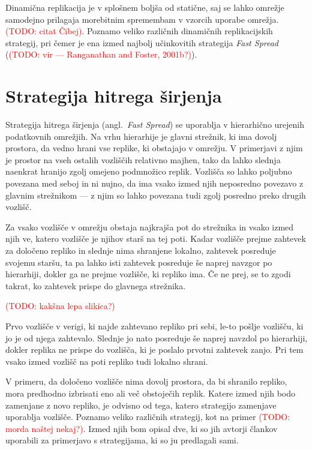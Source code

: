 \documentclass[a4paper, 12pt]{book}
\newcommand{\newterm}{\textit}
\newcommand{\TODO}[1]{\textcolor{red}{(TODO: #1)}}
\begin{document}
Dinamična replikacija je v splošnem boljša od statične, saj se lahko
omre\-žje samodejno prilagaja morebitnim spremembam v vzorcih uporabe omrežja.
\TODO{citat Čibej}. Poznamo veliko različnih dinamičnih replikacijskih
strategij, pri čemer je ena izmed najbolj učinkovitih strategija
\newterm{Fast Spread} (\TODO{vir --- Ranganathan and Foster, 2001b?}).


\section{Strategija hitrega širjenja}

Strategija hitrega širjenja (angl.~\textit{Fast Spread}) se uporablja v
hierarhično urejenih podatkovnih omrežjih. Na vrhu hierarhije je glavni
strežnik, ki ima dovolj prostora, da vedno hrani vse replike, ki obstajajo v
omrežju. V primerjavi z njim je prostor na vseh ostalih vozliščih relativno
majhen, tako da lahko slednja naenkrat hranijo zgolj omejeno podmnožico replik.
Vozlišča so lahko poljubno povezana med seboj in ni nujno, da ima vsako izmed
njih neposredno povezavo z glavnim strežnikom --- z njim so lahko povezana tudi
zgolj posredno preko drugih vozlišč.

Za vsako vozlišče v omrežju obstaja najkrajša pot do strežnika in vsako izmed
njih ve, katero vozlišče je njihov starš na tej poti. Kadar vozlišče prejme
zahtevek za določeno repliko in slednje nima shranjene lokalno, zahtevek
posreduje svojemu staršu, ta pa lahko isti zahtevek posreduje še naprej
navzgor po hierarhiji, dokler ga ne prejme vozlišče, ki repliko ima. Če ne
prej, se to zgodi takrat, ko zahtevek prispe do glavnega strežnika.

\TODO{kakšna lepa slikica?}

Prvo vozlišče v verigi, ki najde zahtevano repliko pri sebi, le-to pošlje
vozlišču, ki jo je od njega zahtevalo. Slednje jo nato posreduje še naprej
navzdol po hierarhiji, dokler replika ne prispe do vozlišča, ki je poslalo
prvotni zahtevek zanjo. Pri tem vsako izmed vozlišč na poti repliko tudi
lokalno shrani.

V primeru, da določeno vozlišče nima dovolj prostora, da bi shranilo repliko,
mora predhodno izbrisati eno ali več obstoječih replik. Katere izmed njih bodo
zamenjane z novo repliko, je odvisno od tega, katero strategijo zamenjave
uporablja vozlišče. Poznamo veliko različnih strategij, kot na primer
\TODO{morda naštej nekaj?}. Izmed njih bom opisal dve, ki so jih avtorji
člankov uporabili za primerjavo s strategijama, ki so ju predlagali sami.
\end{document}
